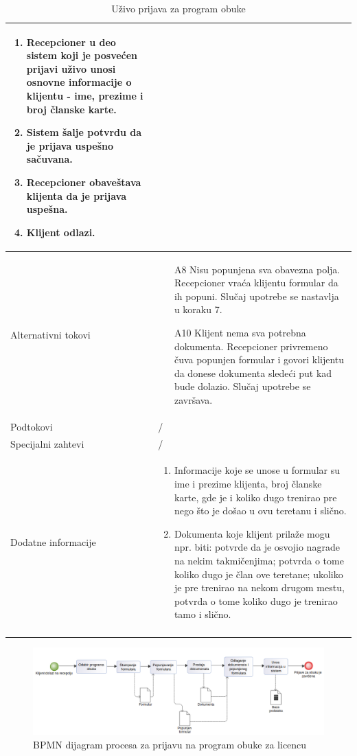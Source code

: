 \documentclass[../../main.tex]{subfiles}
\begin{document}
\begin{longtable}{| p{} | p{} |}
\begin{enumerate}
        \item Recepcioner u deo sistem koji je posvećen prijavi uživo unosi osnovne informacije o klijentu - ime, prezime i broj članske karte.
        \item Sistem šalje potvrdu da je prijava uspešno sačuvana.
        \item Recepcioner obaveštava klijenta da je prijava uspešna.
        \item Klijent odlazi.
    \end{enumerate}\\
\hline
    Alternativni tokovi & 
    \begin{itemize}
        \item[A8] Nisu popunjena sva obavezna polja. Recepcioner vraća klijentu formular da ih popuni. Slučaj upotrebe se nastavlja u koraku 7.
        \item[A10] Klijent nema sva potrebna dokumenta. Recepcioner privremeno čuva popunjen formular i govori klijentu da donese dokumenta sledeći put kad bude dolazio. Slučaj upotrebe se završava. 
    \end{itemize} \\
\hline
    Podtokovi & /\\
\hline
    Specijalni zahtevi & /\\
\hline
    Dodatne informacije &
    \begin{enumerate}
        \item Informacije koje se unose u formular su ime i prezime klijenta, broj članske karte, gde je i koliko dugo trenirao pre nego što je došao u ovu teretanu i slično.
        \item Dokumenta koje klijent prilaže mogu npr. biti: potvrde da je osvojio nagrade na nekim takmičenjima; potvrda o tome koliko dugo je član ove teretane; ukoliko je pre trenirao na nekom drugom mestu, potvrda o tome koliko dugo je trenirao tamo i slično.
    \end{enumerate}\\
\hline
\caption{Uživo prijava za program obuke}
\end{longtable}

\begin{figure}[!ht]
\begin{center}
\includegraphics[scale=0.40]{sections/images/bpmn_dijagram_procesa_prijava_za_licencu.png}
\end{center}
\caption{BPMN dijagram procesa za prijavu na program obuke za licencu}
\label{fig:kontekst}
\end{figure}
\end{document}
